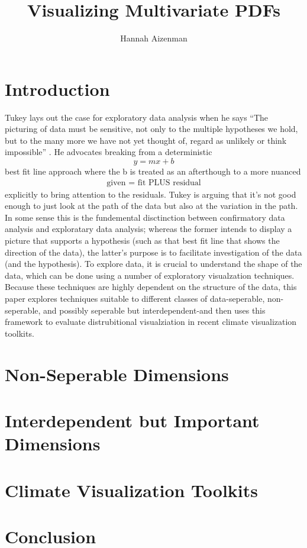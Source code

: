 \documentclass[letterpaper,onecolumn,titlepage]{Ythesis}
\title{Visualizing Multivariate PDFs}
\author{Hannah Aizenman}
\begin{document}
\makefrontmatter

\section{Introduction}
Tukey lays out the case for exploratory data analysis when
he says ``The picturing of data must be sensitive, not only to the multiple
hypotheses we hold, but to the many more we have not yet thought of, regard as unlikely or
think impossible'' \cite{tukey1975}. He advocates breaking from a deterministic $$y=mx+b$$
best fit line approach where the b is treated as an afterthough to a more
nuanced
\begin{align*}
  \text{given = fit PLUS residual}
\end{align*}
explicitly to bring attention to the residuals. Tukey is arguing that it's not
good enough to just look at the path of the data but also at the variation in
the path. In some sense this is the fundemental disctinction between
confirmatory data analysis and exploratary data analysis; whereas the former
intends to display a picture that supports a hypothesis (such as that best fit
line that shows the direction of the data), the latter's purpose is to
facilitate investigation of the data (and the hypothesis). To explore data, it
is crucial to understand the shape of the data, which can be done using a
number of exploratory visualzation techniques. Because these techniques are
highly dependent on the structure of the data, this paper explores techniques suitable to different classes of data-seperable, non-seperable, and
possibly seperable but interdependent-and then uses this framework to evaluate
distrubitional visualziation in recent climate visualization toolkits. 


\section{Non-Seperable Dimensions}
\section{Interdependent but Important Dimensions}
\section{Climate Visualization Toolkits}

\section{Conclusion}
\label{sec:conclusion}


\pagebreak
\printbibliography
\end{document}
